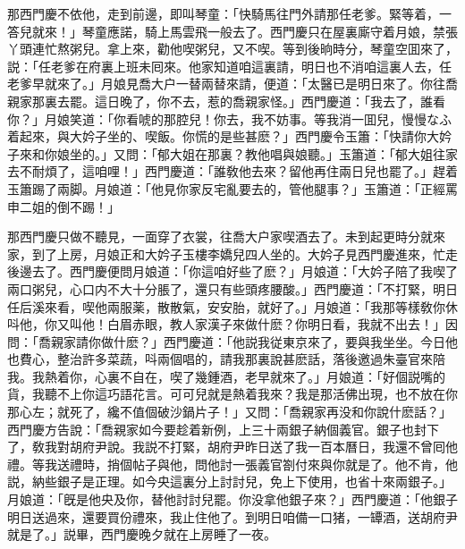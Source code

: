 那西門慶不依他，走到前邊，即叫琴童：「快騎馬往門外請那任老爹。緊等着，一答兒就來！」琴童應諾，騎上馬雲飛一般去了。西門慶只在屋裏廝守着月娘，禁張丫頭連忙熬粥兒。拿上來，勸他喫粥兒，又不喫。等到後晌時分，琴童空囬來了，説：「任老爹在府裏上班未囘來。他家知道咱這裏請，明日也不消咱這裏人去，任老爹早就來了。」月娘見喬大户一替兩替來請，便道：「太醫已是明日來了。你往喬親家那裏去罷。這日晚了，你不去，惹的喬親家怪。」西門慶道：「我去了，誰看你？」月娘笑道：「你看唬的那腔兒！你去，我不妨事。等我消一囬兒，慢慢なふ着起來，與大妗子坐的、喫飯。你慌的是些甚麽？」西門慶令玉簫：「快請你大妗子來和你娘坐的。」又問：「郁大姐在那裏？教他唱與娘聽。」玉簫道：「郁大姐往家去不耐煩了，這咱哩！」西門慶道：「誰敎他去來？留他再住兩日兒也罷了。」趕着玉簫踢了兩脚。月娘道：「他見你家反宅亂要去的，管他腿事？」玉簫道：「正經罵申二姐的倒不踢！」

那西門慶只做不聽見，一面穿了衣裳，往喬大户家喫酒去了。未到起更時分就來家，到了上房，月娘正和大妗子玉樓李嬌兒四人坐的。大妗子見西門慶進來，忙走後邊去了。西門慶便問月娘道：「你這咱好些了麽？」月娘道：「大妗子陪了我喫了兩口粥兒，心口内不大十分脹了，還只有些頭疼腰酸。」西門慶道：「不打緊，明日任后溪來看，喫他兩服薬，散散氣，安安胎，就好了。」月娘道：「我那等樣敎你休呌他，你又叫他！白眉赤眼，教人家漢子來做什麽？你明日看，我就不出去！」因問：「喬親家請你做什麽？」西門慶道：「他説我従東京來了，要與我坐坐。今日他也費心，整治許多菜蔬，呌兩個唱的，請我那裏說甚麽話，落後邀過朱臺官來陪我。我熱着你，心裏不自在，喫了幾鍾酒，老早就來了。」月娘道：「好個説嘴的貨，我聽不上你這巧語花言。可可兒就是熱着我來？我是那活佛出現，也不放在你那心左；就死了，纔不值個破沙鍋片子！」又問：「喬親家再没和你說什麽話？」西門慶方告說：「喬親家如今要趁着新例，上三十兩銀子納個義官。銀子也封下了，敎我對胡府尹說。我説不打緊，胡府尹昨日送了我一百本曆日，我還不曾囘他禮。等我送禮時，捎個帖子與他，問他討一張義官劄付來與你就是了。他不肯，他説，納些銀子是正理。如今央這裏分上討討兒，免上下使用，也省十來兩銀子。」月娘道：「旣是他央及你，替他討討兒罷。你没拿他銀子來？」西門慶道：「他銀子明日送過來，還要買份禮來，我止住他了。到明日咱備一口猪，一罈酒，送胡府尹就是了。」説畢，西門慶晚夕就在上房睡了一夜。

